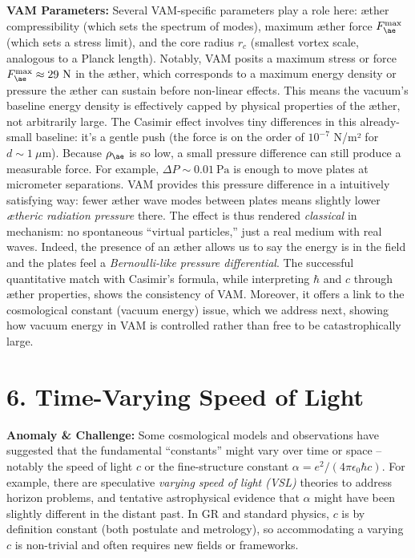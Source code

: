 \documentclass[a4paper, aps,preprint,superscriptaddress, 12pt]{revtex4}
\begin{document}
\textbf{VAM Parameters:} Several VAM-specific parameters play a role here: æther compressibility (which sets the spectrum of modes), maximum æther force $F_{\ae}^{\max}$ (which sets a stress limit), and the core radius $r_c$ (smallest vortex scale, analogous to a Planck length). Notably, VAM posits a maximum stress or force $F_{\ae}^{\max}\approx29~\text{N}$ in the æther, which corresponds to a maximum energy density or pressure the æther can sustain before non-linear effects. This means the vacuum’s baseline energy density is effectively capped by physical properties of the æther, not arbitrarily large. The Casimir effect involves tiny differences in this already-small baseline: it’s a gentle push (the force is on the order of $10^{-7}$ N/m² for $d\sim1~\mu$m). Because $\rho_{\ae}$ is so low, a small pressure difference can still produce a measurable force. For example, $\Delta P \sim 0.01~\text{Pa}$ is enough to move plates at micrometer separations. VAM provides this pressure difference in a intuitively satisfying way: fewer æther wave modes between plates means slightly lower \textit{ætheric radiation pressure} there. The effect is thus rendered \textit{classical} in mechanism: no spontaneous “virtual particles,” just a real medium with real waves. Indeed, the presence of an æther allows us to say the energy is in the field and the plates feel a \textit{Bernoulli-like pressure differential}. The successful quantitative match with Casimir’s formula, while interpreting $\hbar$ and $c$ through æther properties, shows the consistency of VAM. Moreover, it offers a link to the cosmological constant (vacuum energy) issue, which we address next, showing how vacuum energy in VAM is controlled rather than free to be catastrophically large.


\section*{6. Time-Varying Speed of Light}

\textbf{Anomaly \& Challenge: } Some cosmological models and observations have suggested that the fundamental “constants” might vary over time or space – notably the speed of light $c$ or the fine-structure constant $\alpha = e^2/(4\pi\epsilon_0\hbar c)$. For example, there are speculative \textit{varying speed of light (VSL)} theories to address horizon problems, and tentative astrophysical evidence that $\alpha$ might have been slightly different in the distant past. In GR and standard physics, $c$ is by definition constant (both postulate and metrology), so accommodating a varying $c$ is non-trivial and often requires new fields or frameworks.
\end{document}
